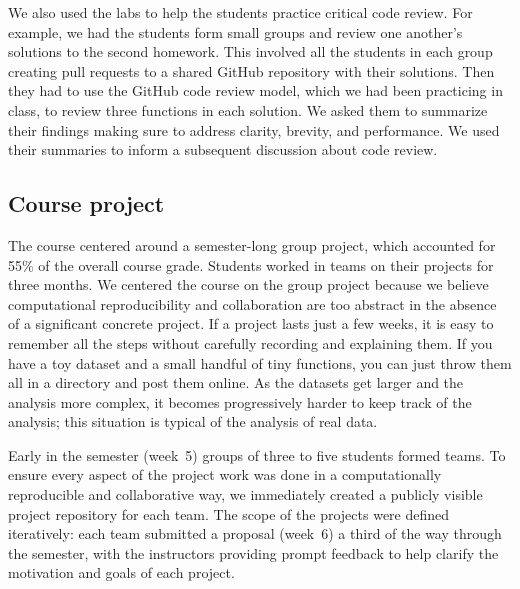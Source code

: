 We also used the labs to help the students practice critical code review.
For example, we had the students form small groups and review one another's
solutions to the second homework.
This involved all the students in each group creating pull requests to a
shared GitHub repository with their solutions.
Then they had to use the GitHub code review model, which we had been practicing
in class, to review three functions in each solution.
We asked them to summarize their findings making sure to address
clarity, brevity, and performance.
We used their summaries to inform a subsequent discussion about code review.

\subsection{Course project}\label{project}

The course centered around a semester-long group project, which accounted for 55\%
of the overall course grade.
Students worked in teams on their projects for three months.
We centered the course on the group project because we believe computational
reproducibility and collaboration are too abstract in the absence of a
significant concrete project.
If a project lasts just a few weeks, it is easy to remember all the steps
without carefully recording and explaining them.
If you have a toy dataset and a small handful of tiny functions, you can just
throw them all in a directory and post them online.  As the datasets get
larger and the analysis more complex, it becomes progressively harder to keep
track of the analysis; this situation is typical of the analysis of real data.


Early in the semester (week~5) groups of three to five students formed teams.
To ensure every aspect of the project work was done in a computationally
reproducible and collaborative way, we immediately created a publicly visible
project repository for each team.
The scope of the projects were defined iteratively: each team submitted a
proposal (week~6) a third of the way through the semester, with the instructors
providing prompt feedback to help clarify the motivation and goals of each
project.

